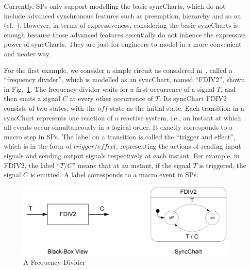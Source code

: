 \documentclass{fcs}
\begin{document}
Currently, SPs only support modelling the basic syncCharts, which do not include advanced synchronous features such as preemption, hierarchy and so on (cf.~\cite{Andre03}).
However, in terms of expressiveness, considering the basic syncCharts is enough because those advanced features essentially do not inhence the expressive power of syncCharts.
They are just for engineers to model in a more convenient and neater way.



For the first example, we consider a simple circuit as considered in~\cite{Andre03}, called a ``frequency divider'', which is modelled as an syncChart, named ``FDIV2'', shown in Fig.~\ref{figure:A Frequency Divider}.
The frequency dividor waits for a first occurrence of a signal $T$, and then emits a signal $C$ at every other occurrence of $T$.
Its syncChart FDIV2 consists of two states, with the $\mathit{off}$ state as the initial state.
Each transition in a syncChart represents one reaction of a reactive system, i.e., an instant at which all events occur simultaneously in a logical order.
It exactly corresponds to a macro step in SPs.
The label on a transition is called the ``trigger and effect'', which is in the form of $\mathit{trigger}/\mathit{effect}$, representing the actions of reading input signals and sending output signals respectively at each instant.
For example, in FDIV2, the label ``$T/C$'' means that at an instant, if the signal $T$ is triggered, the signal $C$ is emitted.
A label corresponds to a macro event in SPs.

\begin{figure}[htpb]
        \centering
        \includegraphics[width=0.8\linewidth]{figures/example1.png}
        \caption{A Frequency Divider}
        \label{figure:A Frequency Divider}
    \end{figure}
\end{document}
